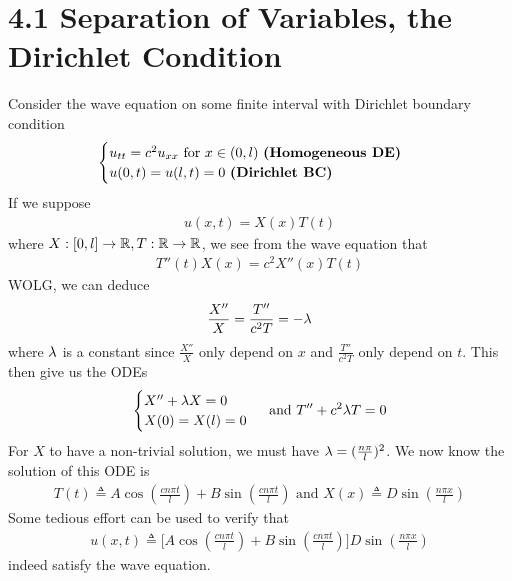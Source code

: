 \documentclass{report}
\begin{document}
\section{4.1 Separation of Variables, the Dirichlet Condition}
\begin{mdframed}
Consider the wave equation on some finite interval with Dirichlet boundary condition 
\begin{align*}
\begin{cases}
  u_{tt}=c^2u_{xx}\text{ for }x\in (0,l)\text{ \textbf{(Homogeneous DE)} } \\
  u(0,t)=u(l,t)=0\text{ \textbf{(Dirichlet BC)} }
\end{cases}
\end{align*}
If we suppose 
\begin{align*}
u(x,t)=X(x)T(t)
\end{align*}
where $X:[0,l]\rightarrow \mathbb{R},T:\mathbb{R}\rightarrow \mathbb{R}$, we see from the wave equation that 
\begin{align*}
T''(t)X(x)=c^2X''(x)T(t)
\end{align*}
WOLG, we can deduce 
\begin{align*}
\frac{X''}{X}=\frac{T''}{c^2T}=-\lambda 
\end{align*}
where $\lambda $ is a constant since $\frac{X''}{X}$ only depend on $x$ and  $\frac{T''}{c^2T}$ only depend on $t$. This then give us the ODEs 
\begin{align*}
\begin{cases}
  X''+\lambda  X=0 \\
  X(0)=X(l)=0
\end{cases}\text{ and }T''+c^2\lambda  T=0 
\end{align*}
For $X$ to have a non-trivial solution, we must have $\lambda = (\frac{n \pi}{l})^2$. We now know the solution of this ODE is 
\begin{align*}
T(t)\triangleq A\cos ( \frac{ cn \pi t}{l} )+B\sin ( \frac{cn \pi t}{l})\text{ and }X(x)\triangleq D\sin ( \frac{n \pi x}{l} )
\end{align*}
Some tedious effort can be used to verify that 
\begin{align*}
u(x,t)\triangleq \Big[ A\cos (\frac{c n \pi t}{l})+ B \sin ( \frac{c n \pi t}{l}) \Big]D \sin ( \frac{n \pi x}{l})
\end{align*}
indeed satisfy the wave equation. 
\end{mdframed}
\end{document}
